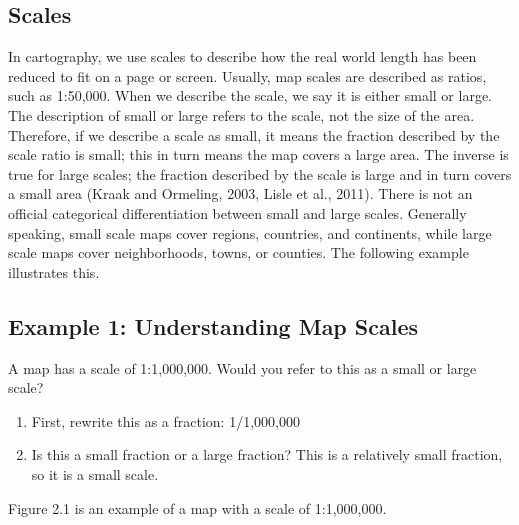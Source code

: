 \documentclass[a4paper , 12pt]{book}
\begin{document}
\subsection{Scales}

In cartography, we use scales to describe how the real world length has been reduced to fit on a page or screen. Usually, map scales are described as ratios, such as 1:50,000. When we describe the scale, we say it is either small or large. The description of small or large refers to the scale, not the size of the area. Therefore, if we describe a scale as small, it means the fraction described by the scale ratio is small; this in turn means the map covers a large area. The inverse is true for large scales; the fraction described by the scale is large and in turn covers a small area (Kraak and Ormeling, 2003, Lisle et al., 2011). There is not an official categorical differentiation between small and large scales. Generally speaking, small scale maps cover regions, countries, and continents, while large scale maps cover neighborhoods, towns, or counties. The following example illustrates this.

\subsection*{Example 1: Understanding Map Scales}

A map has a scale of 1:1,000,000. Would you refer to this as a small or large scale?

\begin{enumerate}
    \item First, rewrite this as a fraction: 1/1,000,000
    \item Is this a small fraction or a large fraction? This is a relatively small fraction, so it is a small scale. 
\end{enumerate}

Figure 2.1 is an example of a map with a scale of 1:1,000,000.
\end{document}
